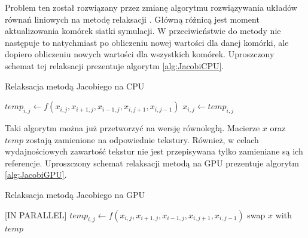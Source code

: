 Problem ten został rozwiązany przez zmianę algorytmu rozwiązywania układów
równań liniowych na metodę relaksacji . Główną różnicą jest moment
aktualizowania komórek siatki symulacji. W przeciwieństwie do metody  nie następuje to natychmiast po obliczeniu nowej wartości dla danej
komórki, ale dopiero obliczeniu nowych wartości dla wszystkich komórek.
Uproszczony schemat tej relaksacji prezentuje algorytm \ref{alg:JacobiCPU}.

\begin{algorithm}[H]
  \caption{Relaksacja metodą Jacobiego na CPU}
  \label{alg:JacobiCPU}
\begin{algorithmic}
    \State $temp_{i,j}\gets f(x_{i,j}, x_{i+1,j}, x_{i-1,j}, x_{i,j+1}, x_{i,j-1})$
  \EndFor
    \State $x_{i,j}\gets temp_{i,j}$
  \EndFor
\EndFor
\end{algorithmic}
\end{algorithm}

Taki algorytm można już przetworzyć na wersję równoległą. Macierze $x$ oraz
$temp$  zostają zamienione na odpowiednie tekstury. Również, w celach
wydajnościowych zawartość tekstur nie jest przepisywana tylko zamieniane są
ich referencje. Uproszczony schemat relaksacji metodą  na GPU
prezentuje algorytm \ref{alg:JacobiGPU}.

\begin{algorithm}[H]
  \caption{Relaksacja metodą Jacobiego na GPU}
  \label{alg:JacobiGPU}
\begin{algorithmic}
   [IN PARALLEL]
    \State $temp_{i,j}\gets f(x_{i,j}, x_{i+1,j}, x_{i-1,j}, x_{i,j+1}, x_{i,j-1})$
  \EndFor
  \State swap $x$ with $temp$
\EndFor
\end{algorithmic}
\end{algorithm}

